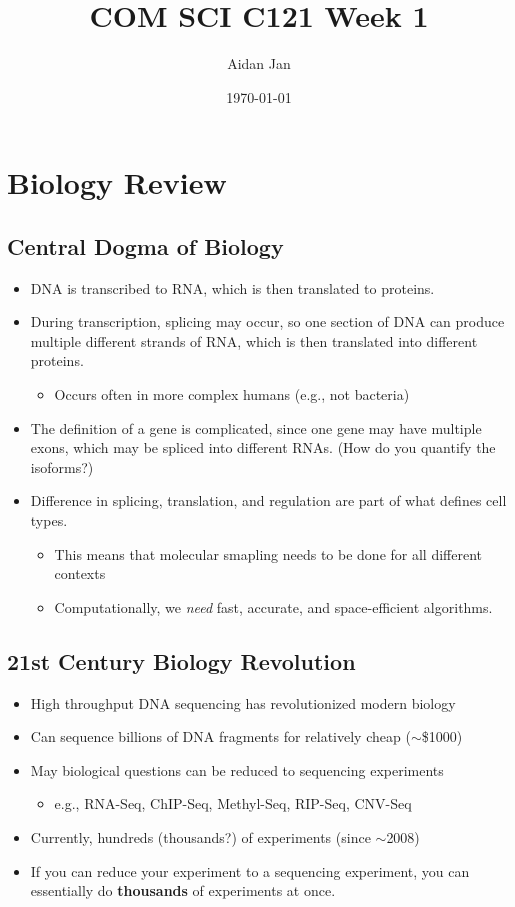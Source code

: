 \documentclass[10pt]{article}
\title{COM SCI C121 Week 1}
\author{Aidan Jan}
\date{\today}
\begin{document}
\maketitle
\section*{Biology Review}
\subsection*{Central Dogma of Biology}
\begin{itemize}
    \item DNA is transcribed to RNA, which is then translated to proteins.
    \item During transcription, splicing may occur, so one section of DNA can produce multiple different strands of RNA, which is then translated into different proteins.
    \begin{itemize}
        \item Occurs often in more complex humans (e.g., not bacteria)
    \end{itemize}
    \item The definition of a gene is complicated, since one gene may have multiple exons, which may be spliced into different RNAs.  (How do you quantify the isoforms?)
    \item Difference in splicing, translation, and regulation are part of what defines cell types.
    \begin{itemize}
        \item This means that molecular smapling needs to be done for all different contexts
        \item Computationally, we \textit{need} fast, accurate, and space-efficient algorithms.
    \end{itemize}
\end{itemize}
\subsection*{21st Century Biology Revolution}
\begin{itemize}
    \item High throughput DNA sequencing has revolutionized modern biology
    \item Can sequence billions of DNA fragments for relatively cheap ($\sim$\$1000)
    \item May biological questions can be reduced to sequencing experiments
    \begin{itemize}
        \item e.g., RNA-Seq, ChIP-Seq, Methyl-Seq, RIP-Seq, CNV-Seq
    \end{itemize}
    \item Currently, hundreds (thousands?) of experiments (since $\sim$2008)
    \item If you can reduce your experiment to a sequencing experiment, you can essentially do \textbf{thousands} of experiments at once.
\end{itemize}
\end{document}
